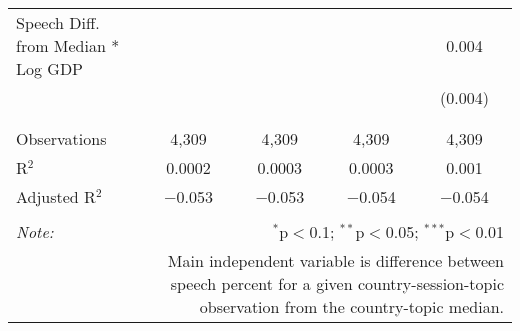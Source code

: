 \begin{table}[!htbp]
\begin{tabular}{@{\extracolsep{5pt}}lcccc}
 Speech Diff. from Median * Log GDP &  &  &  & 0.004 \\ 
  &  &  &  & (0.004) \\ 
  & & & & \\ 
\hline \\[-1.8ex] 
Observations & 4,309 & 4,309 & 4,309 & 4,309 \\ 
R$^{2}$ & 0.0002 & 0.0003 & 0.0003 & 0.001 \\ 
Adjusted R$^{2}$ & $-$0.053 & $-$0.053 & $-$0.054 & $-$0.054 \\ 
\hline 
\hline \\[-1.8ex] 
\textit{Note:}  & \multicolumn{4}{r}{$^{*}$p$<$0.1; $^{**}$p$<$0.05; $^{***}$p$<$0.01} \\ 
 & \multicolumn{4}{r}{Main independent variable is difference between speech percent for a given country-session-topic observation from the country-topic median.} \\ 
\end{tabular} 
\end{table} 
